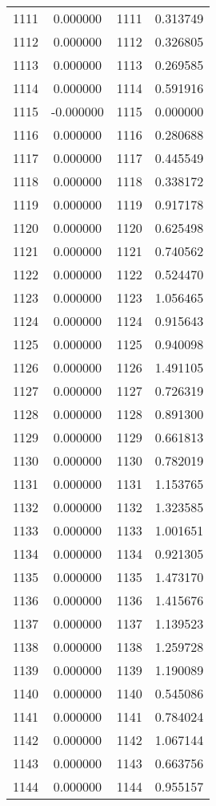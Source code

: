 \documentclass[12pt]{article}
\begin{document}
\begin{longtable}{@{}cccc@{}}
1111 & 0.000000 & 1111 & 0.313749 \\
1112 & 0.000000 & 1112 & 0.326805 \\
1113 & 0.000000 & 1113 & 0.269585 \\
1114 & 0.000000 & 1114 & 0.591916 \\
1115 & -0.000000 & 1115 & 0.000000 \\
1116 & 0.000000 & 1116 & 0.280688 \\
1117 & 0.000000 & 1117 & 0.445549 \\
1118 & 0.000000 & 1118 & 0.338172 \\
1119 & 0.000000 & 1119 & 0.917178 \\
1120 & 0.000000 & 1120 & 0.625498 \\
1121 & 0.000000 & 1121 & 0.740562 \\
1122 & 0.000000 & 1122 & 0.524470 \\
1123 & 0.000000 & 1123 & 1.056465 \\
1124 & 0.000000 & 1124 & 0.915643 \\
1125 & 0.000000 & 1125 & 0.940098 \\
1126 & 0.000000 & 1126 & 1.491105 \\
1127 & 0.000000 & 1127 & 0.726319 \\
1128 & 0.000000 & 1128 & 0.891300 \\
1129 & 0.000000 & 1129 & 0.661813 \\
1130 & 0.000000 & 1130 & 0.782019 \\
1131 & 0.000000 & 1131 & 1.153765 \\
1132 & 0.000000 & 1132 & 1.323585 \\
1133 & 0.000000 & 1133 & 1.001651 \\
1134 & 0.000000 & 1134 & 0.921305 \\
1135 & 0.000000 & 1135 & 1.473170 \\
1136 & 0.000000 & 1136 & 1.415676 \\
1137 & 0.000000 & 1137 & 1.139523 \\
1138 & 0.000000 & 1138 & 1.259728 \\
1139 & 0.000000 & 1139 & 1.190089 \\
1140 & 0.000000 & 1140 & 0.545086 \\
1141 & 0.000000 & 1141 & 0.784024 \\
1142 & 0.000000 & 1142 & 1.067144 \\
1143 & 0.000000 & 1143 & 0.663756 \\
1144 & 0.000000 & 1144 & 0.955157 \\

\end{longtable}
\end{document}
